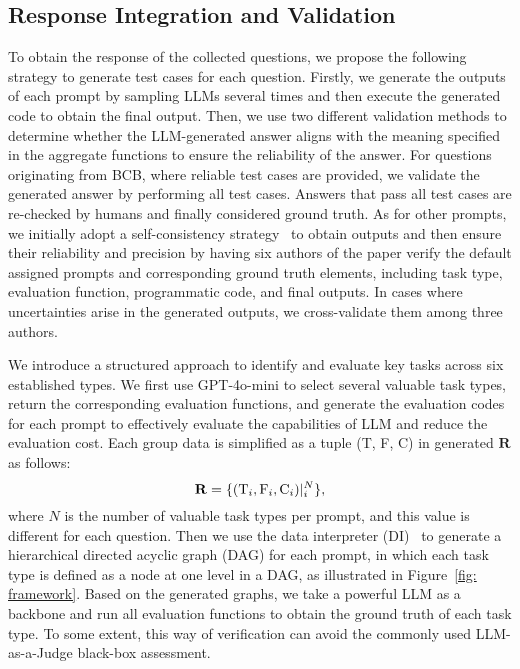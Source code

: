 \subsection{Response Integration and Validation}

 To obtain the response of the collected questions, we propose the following strategy to generate test cases for each question. 
Firstly, we generate the outputs of each prompt by sampling LLMs several times and then execute the generated code to obtain the final output.
Then, we use two different validation methods to determine whether the LLM-generated answer aligns with the meaning specified in the aggregate functions to ensure the reliability of the answer. 
For questions originating from BCB, where reliable test cases are provided, we validate the generated answer by performing all test cases. Answers that pass all test cases are re-checked by humans and finally considered ground truth. 
As for other prompts, we initially adopt a self-consistency strategy~\citep{wang2022self} to obtain outputs and then ensure their reliability and precision by having six authors of the paper verify the default assigned prompts and corresponding ground truth elements, including task type, evaluation function, programmatic code, and final outputs. In cases where uncertainties arise in the generated outputs, we cross-validate them among three authors.


 We introduce a structured approach to identify and evaluate key tasks across six established types.
We first use GPT-4o-mini to select several valuable task types, return the corresponding evaluation functions, and generate the evaluation codes for each prompt to effectively evaluate the capabilities of LLM and reduce the evaluation cost.
Each group data is simplified as a tuple (T, F, C) in generated $\mathbf{R}$ as follows:
\begin{equation}
    \vspace{-0.1cm}
    \mathbf{R} = \{(\text{T}_i, \text{F}_i, \text{C}_i)|_i^N\},
    \vspace{-0.1cm}
\end{equation}
where $N$ is the number of valuable task types per prompt, and this value is different for each question.
Then we use the data interpreter (DI)~\citep{hong2024datainterpreter} to generate a hierarchical directed acyclic graph (DAG) for each prompt, in which each task type is defined as a node at one level in a DAG, as illustrated in Figure~\ref{fig: framework}.
Based on the generated graphs, we take a powerful LLM as a backbone and run all evaluation functions to obtain the ground truth of each task type.
To some extent, this way of verification can avoid the commonly used LLM-as-a-Judge black-box assessment.


